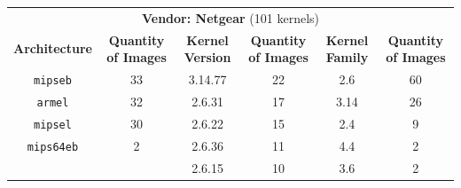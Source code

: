 \begin{table}[h]
{\begin{tabular}{cccccc}
\multicolumn{6}{c}{\textbf{Vendor: Netgear} (101 kernels)}                                                                        \\
\textbf{Architecture} & \multicolumn{1}{c|}{\textbf{Quantity of Images}} & \textbf{Kernel Version} & \multicolumn{1}{c|}{\textbf{Quantity of Images}} & \textbf{Kernel Family} & \textbf{Quantity of Images} \\ \hline
{\tt mipseb}              & \multicolumn{1}{c|}{33}               & 3.14.77                 & \multicolumn{1}{c|}{22}                          & 2.6                    & 60                          \\
{\tt armel}               & \multicolumn{1}{c|}{32}               & 2.6.31                  & \multicolumn{1}{c|}{17}                          & 3.14                   & 26                          \\
{\tt mipsel}              & \multicolumn{1}{c|}{30}               & 2.6.22                  & \multicolumn{1}{c|}{15}                          & 2.4                    & 9                           \\
{\tt mips64eb}            & \multicolumn{1}{c|}{2}                & 2.6.36                  & \multicolumn{1}{c|}{11}                          & 4.4                    & 2                           \\
                          &                                       & 2.6.15                  & \multicolumn{1}{c|}{10}                          & 3.6                    & 2                           \\ \hline


\end{tabular}}
\end{table}
